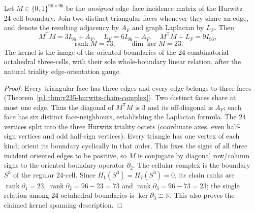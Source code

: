\documentclass[11pt]{article}
\begin{document}
\begin{theorem}
\label{p1:thm:v365-hurwitz-face-laplacian}
Let $M\in\{0,1\}^{96\times96}$ be the \emph{unsigned} edge--face
incidence matrix of the Hurwitz 24-cell boundary.  Join two distinct
triangular faces whenever they share an edge, and denote the resulting
adjacency by $A_F$ and graph Laplacian by $L_F$.  Then
\[
 \boxed{M^{\mathsf T}M=3I_{96}+A_F,\quad
 L_F=6I_{96}-A_F,\quad M^{\mathsf T}M+L_F=9I_{96}},
\]
\[
 \boxed{\operatorname{rank}M=73,\qquad\dim\ker M=23.}
\]
The kernel is the image of the oriented boundaries of the 24
combinatorial octahedral three-cells, with their sole whole-boundary
linear relation, after the natural triality edge-orientation gauge.
\end{theorem}
\begin{proof}
Every triangular face has three edges and every edge belongs to three
faces (Theorem~\ref{p1:thm:v235-hurwitz-chain-complex}).  Two distinct
faces share at most one edge.  Thus the diagonal of $M^{\mathsf T}M$
is 3 and its off-diagonal is $A_F$; each face has six distinct
face-neighbours, establishing the Laplacian formula.  The 24 vertices
split into the three Hurwitz triality octets (coordinate axes, even
half-sign vertices and odd half-sign vertices).  Every triangle has
one vertex of each kind; orient its boundary cyclically in that order.
This fixes the signs of all three incident oriented edges to be
positive, so $M$ is conjugate by diagonal row/column signs to the
oriented boundary operator $\partial_2$.  The cellular complex is
the boundary $S^3$ of the regular 24-cell.  Since $H_1(S^3)=H_2(S^3)=0$,
its chain ranks are $\operatorname{rank}\partial_1=23$,
$\operatorname{rank}\partial_2=96-23=73$ and
$\operatorname{rank}\partial_3=96-73=23$; the single relation
among 24 octahedral boundaries is $\ker\partial_3\cong\mathbb R$.
This also proves the claimed kernel spanning description.
\end{proof}
\end{document}
